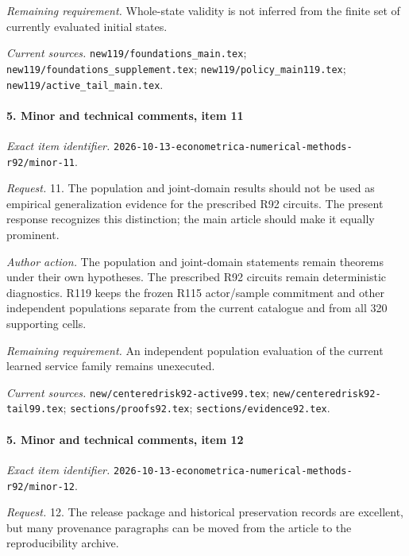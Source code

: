\par\emph{Remaining requirement.} Whole-state validity is not inferred from the finite set of currently evaluated initial states.

\par\emph{Current sources.} \nolinkurl{new119/foundations_main.tex}; \nolinkurl{new119/foundations_supplement.tex}; \nolinkurl{new119/policy_main119.tex}; \nolinkurl{new119/active_tail_main.tex}.

\paragraph{5. Minor and technical comments, item 11}

\emph{Exact item identifier.} \nolinkurl{2026-10-13-econometrica-numerical-methods-r92/minor-11}.

\par\emph{Request.} 11. The population and joint-domain results should not be used as empirical generalization evidence for the prescribed R92 circuits. The present response recognizes this distinction; the main article should make it equally prominent.

\par\emph{Author action.} The population and joint-domain statements remain theorems under their own hypotheses. The prescribed R92 circuits remain deterministic diagnostics. R119 keeps the frozen R115 actor/\allowbreak{}sample commitment and other independent populations separate from the current catalogue and from all 320 supporting cells.

\par\emph{Remaining requirement.} An independent population evaluation of the current learned service family remains unexecuted.

\par\emph{Current sources.} \nolinkurl{new/centeredrisk92-active99.tex}; \nolinkurl{new/centeredrisk92-tail99.tex}; \nolinkurl{sections/proofs92.tex}; \nolinkurl{sections/evidence92.tex}.

\paragraph{5. Minor and technical comments, item 12}

\emph{Exact item identifier.} \nolinkurl{2026-10-13-econometrica-numerical-methods-r92/minor-12}.

\par\emph{Request.} 12. The release package and historical preservation records are excellent, but many provenance paragraphs can be moved from the article to the reproducibility archive.

